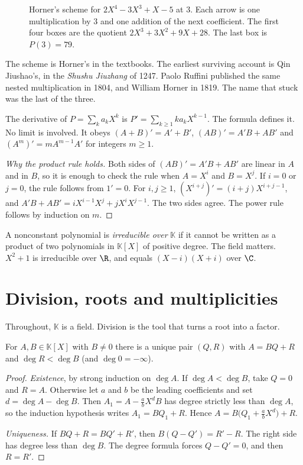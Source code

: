 \begin{figure}[ht]
\centering
{}
\caption{Horner's scheme for $2X^4-3X^3+X-5$ at $3$. Each arrow is one multiplication by $3$ and one addition of the next coefficient. The first four boxes are the quotient $2X^3+3X^2+9X+28$. The last box is $P(3)=79$.}
\label{fig:horner}
\end{figure}

The scheme is Horner's in the textbooks. The earliest surviving account is Qin Jiushao's, in the \emph{Shushu Jiuzhang} of 1247. Paolo Ruffini published the same nested multiplication in 1804, and William Horner in 1819. The name that stuck was the last of the three.

\begin{definitionx}
The derivative of $P=\sum_ka_kX^k$ is $P'=\sum_{k\ge1}ka_kX^{k-1}$. The formula defines it. No limit is involved. It obeys $(A+B)'=A'+B'$, $(AB)'=A'B+AB'$ and $(A^m)'=mA^{m-1}A'$ for integers $m\ge1$.
\end{definitionx}
\begin{proof}[Why the product rule holds]
Both sides of $(AB)'=A'B+AB'$ are linear in $A$ and in $B$, so it is enough to check the rule when $A=X^i$ and $B=X^j$. If $i=0$ or $j=0$, the rule follows from $1'=0$. For $i,j\ge1$, $(X^{i+j})'=(i+j)X^{i+j-1}$, and $A'B+AB'=iX^{i-1}X^j+jX^iX^{j-1}$. The two sides agree. The power rule follows by induction on $m$.
\end{proof}

A nonconstant polynomial is \emph{irreducible over} $\mathbb K$ if it cannot be written as a product of two polynomials in $\mathbb K[X]$ of positive degree. The field matters. $X^2+1$ is irreducible over $\R$, and equals $(X-i)(X+i)$ over $\C$.

\section{Division, roots and multiplicities}

Throughout, $\mathbb K$ is a field. Division is the tool that turns a root into a factor.

\begin{proposition}\label{prop:polydiv}
For $A,B\in\mathbb K[X]$ with $B\ne0$ there is a unique pair $(Q,R)$ with $A=BQ+R$ and $\deg R<\deg B$ (and $\deg0=-\infty$).
\end{proposition}
\begin{proof}
\emph{Existence}, by strong induction on $\deg A$. If $\deg A<\deg B$, take $Q=0$ and $R=A$. Otherwise let $a$ and $b$ be the leading coefficients and set $d=\deg A-\deg B$. Then $A_1=A-\frac abX^dB$ has degree strictly less than $\deg A$, so the induction hypothesis writes $A_1=BQ_1+R$. Hence $A=B\bigl(Q_1+\frac abX^d\bigr)+R$.

\emph{Uniqueness.} If $BQ+R=BQ'+R'$, then $B(Q-Q')=R'-R$. The right side has degree less than $\deg B$. The degree formula forces $Q-Q'=0$, and then $R=R'$.
\end{proof}


